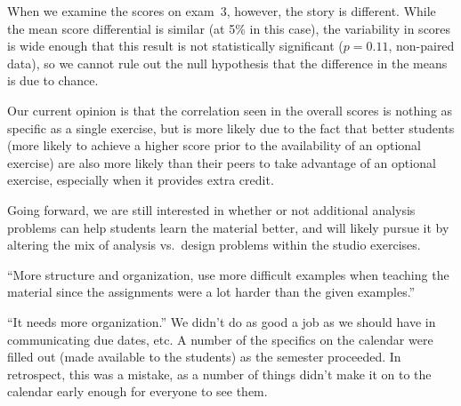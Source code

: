 When we examine the scores on exam~3, however, the story is different.
While the mean score differential is similar (at 5\% in this case), the
variability in scores is wide enough that this result is not
statistically significant ($p = 0.11$, non-paired data), so we cannot
rule out the null hypothesis that the difference in the means is
due to chance.

Our current opinion is that the correlation seen in the overall scores
is nothing as specific as a single exercise, but is more likely due to the
fact that better students (more likely to achieve a higher score prior
to the availability of an optional exercise) are also more likely than
their peers to take advantage of an optional exercise, especially when
it provides extra credit.

Going forward, we are still interested in whether or not additional
analysis problems can help students learn the material better, and will
likely pursue it by altering the mix of analysis vs.~design problems
within the studio exercises.

``More structure and organization, use more difficult examples when
teaching the material since the assignments were a lot harder than
the given examples.''

``It needs more organization.'' We didn't do as good a job as we should have
in communicating due dates, etc. A number of the specifics on the calendar
were filled out (made available to the students) as the semester proceeded.
In retrospect, this was a mistake, as a number of things didn't make it on
to the calendar early enough for everyone to see them.
